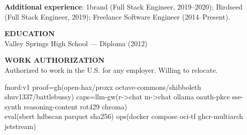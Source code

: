 \documentclass[10pt]{article}
\begin{document}
\textbf{Additional experience}: 1brand (Full Stack Engineer, 2019--2020); Birdseed (Full Stack Engineer, 2019); Freelance Software Engineer (2014--Present).

\vspace{4pt}
\textbf{EDUCATION}\\
Valley Springs High School --- Diploma (2012)

\vspace{2pt}
\textbf{WORK AUTHORIZATION}\\
Authorized to work in the U.S. for any employer. Willing to relocate.

\vspace{2pt}
{\scriptsize\ttfamily
fnord:v1\; proof=gh(open-hax/proxx octave-commons/shibboleth shuv1337/battlebussy)\; caps=llm-gw(r->chat m->chat ollama oauth-pkce sse-synth reasoning-content rot429 chroma)\\
eval(sbert hdbscan parquet sha256)\; ops(docker compose oci-tf ghcr-multiarch jetstream)
}
\end{document}
